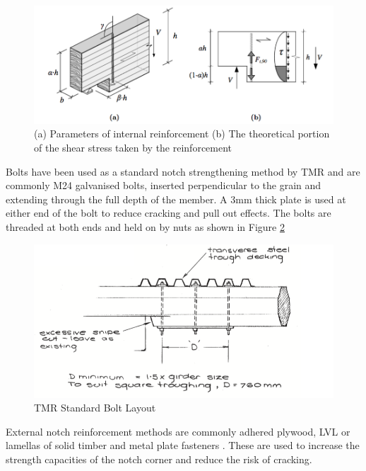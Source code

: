 \documentclass[11pt,a4paper]{article}
\numberwithin{equation}{subsection}
\begin{document}
	\begin{center}
		\begin{figure}[h]
			\includegraphics[scale=0.5]{Notch_Screw}
			\caption{(a) Parameters of internal reinforcement  (b) The theoretical portion of the shear stress taken by the reinforcement  \cite{jockwer_structural_2014}}
			\label{fig:Internal}
		\end{figure}
	\end{center}
	\pagebreak

	
\noindent
Bolts have been used as a standard notch strengthening method by TMR and are commonly M24 galvanised bolts, inserted perpendicular to the grain and extending through the full depth of the member. A 3mm thick plate is used at either end of the bolt to reduce cracking and pull out effects. The bolts are threaded at both ends and held on by nuts as shown in Figure \ref{fig:Internal2} \cite{_timber_2005}

		\begin{figure}[h]
			\includegraphics[scale=0.5]{Bolt_Layout}
			\caption{TMR Standard Bolt Layout \cite{_timber_2005}}
			\label{fig:Internal2}
		\end{figure}

\noindent
External notch reinforcement methods are commonly adhered plywood, LVL or lamellas of solid timber and metal plate fasteners \cite{jockwer_structural_2014,fawwaz_structural_2012}. These are used to increase the strength capacities of the notch corner and reduce the risk of cracking. 
\end{document}

